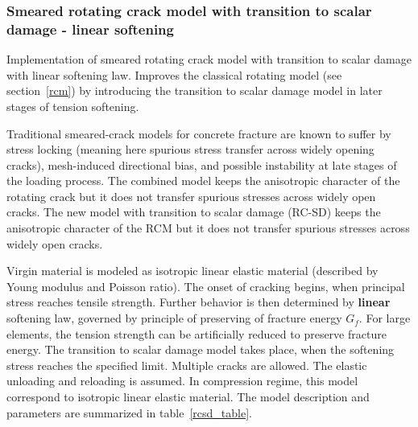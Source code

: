 \documentclass[a4paper]{article}
\begin{document}
\subsubsection{Smeared rotating crack model with transition to scalar
damage - linear softening}
\label{rcsd}
Implementation of smeared rotating crack model with transition to
scalar damage with linear softening law.
Improves the classical rotating model (see
section~\ref{rcm}) by introducing the transition to scalar damage
model in  later stages of tension softening.

Traditional smeared-crack models for concrete fracture are known to suffer by stress locking (meaning here spurious stress transfer across widely opening cracks),
mesh-induced directional bias, and possible instability at late stages of the loading process.
The combined model keeps the anisotropic character of the rotating
crack but it does not transfer spurious stresses across
widely open cracks.
The new model with transition to
scalar damage (RC-SD) keeps the anisotropic character of the RCM but
it does not transfer spurious stresses across widely open cracks.

Virgin material is modeled as isotropic linear elastic material
(described by Young modulus and Poisson
ratio). The onset of cracking begins, when principal stress reaches
tensile strength.
Further behavior is then determined by {\bf linear} softening law,
governed by principle of preserving of fracture
energy $G_f$. For large elements, the tension strength can be
artificially reduced
to preserve fracture energy.  The transition to scalar damage model
takes place, when the softening stress reaches the specified limit.
Multiple cracks are allowed.
The elastic unloading and reloading is assumed.
In compression regime, this model correspond to isotropic linear elastic material.
The model description and parameters are summarized
in table~\ref{rcsd_table}.
\end{document}
